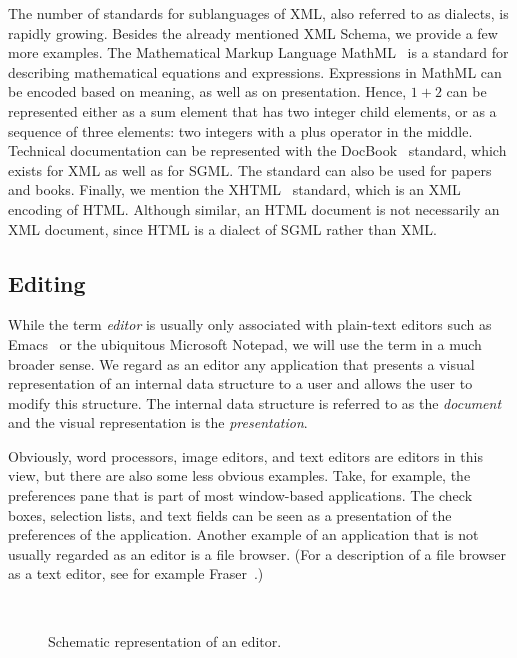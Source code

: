 \documentclass{speauth}
\begin{document}
The number of standards for sublanguages of XML, also referred to as dialects, is rapidly growing. Besides the already mentioned XML Schema, we provide a few more examples. The Mathematical Markup Language MathML~\cite{mathml20} is a standard for describing mathematical equations and expressions.  \bc Expressions in MathML can be encoded based on  meaning, as well as on presentation. Hence, $1+2$ can be represented either as a sum  element that has two integer child elements, or as a sequence of three elements: two integers with a plus operator in the middle.  \ec Technical documentation can be represented with the DocBook~\cite{walsh02docbook} standard, which exists for XML as well as for SGML. The standard can also be used for papers and books. Finally, we mention the XHTML~\cite{xhtml11} standard, which is an XML encoding of HTML. Although similar, an HTML document is not necessarily an XML document, since HTML is a dialect of SGML rather than XML.

\subsection{Editing}
\label{sect:editing}
While the term {\em editor} is usually only associated with plain-text editors such as Emacs~\cite{stallman81emacs} or the ubiquitous Microsoft Notepad, we will use the term in a much broader sense. We regard as an editor any application that presents a visual representation of an internal data structure to a user and allows the user to modify this structure. The internal data structure is referred to as the {\em document} and the visual representation is the {\em presentation}. 

Obviously, word processors, image editors, and text editors are editors in this view, but there are also some less obvious examples. Take, for example, the preferences pane that is part of most window-based applications. The check boxes, selection lists, and text fields can be seen as a presentation of the preferences of the application. Another example of an application that is not usually regarded as an editor is a file browser. (For a description of a file browser as a text editor, see for example Fraser~\cite{fraser80generalizedEditor}.)

\begin{figure}

\begin{small}

\begin{center}

\begin{center}

~\hspace{1.7cm}

\end{center}\caption{Schematic representation of an editor.}\label{editor} 

\end{center}

\end{small}

\end{figure}
\end{document}
